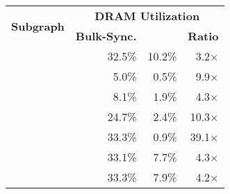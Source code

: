 \begin{tabular}{lrrr}
\multirow{2}{*}{\textbf{Subgraph}} & \multicolumn{3}{c}{\textbf{DRAM Utilization}}                                                                        \\
                                   & \multicolumn{1}{l}{\textbf{Bulk-Sync.}} & \multicolumn{1}{l}{\textbf{\thethingsw{}}} & \multicolumn{1}{l}{\textbf{Ratio}} \\ \hline
\multicolumn{1}{l|}{\mgnmlp{}} & 32.5\% & 10.2\% & 3.2$\times$  \\
\multicolumn{1}{l|}{\dlrmbot{}} & 5.0\%  & 0.5\%  & 9.9$\times$  \\
\multicolumn{1}{l|}{\dlrmtop{}} & 8.1\%  & 1.9\%  & 4.3$\times$  \\
\multicolumn{1}{l|}{\bertffn{}}    & 24.7\% & 2.4\%  & 10.3$\times$ \\
\multicolumn{1}{l|}{\nerfall{}}   & 33.3\% & 0.9\%  & 39.1$\times$ \\
\multicolumn{1}{l|}{\gcnodes{}}    & 33.1\% & 7.7\%  & 4.3$\times$  \\
\multicolumn{1}{l|}{\gcedges{}}    & 33.3\% & 7.9\%  & 4.2$\times$  \\ \hline
\end{tabular}